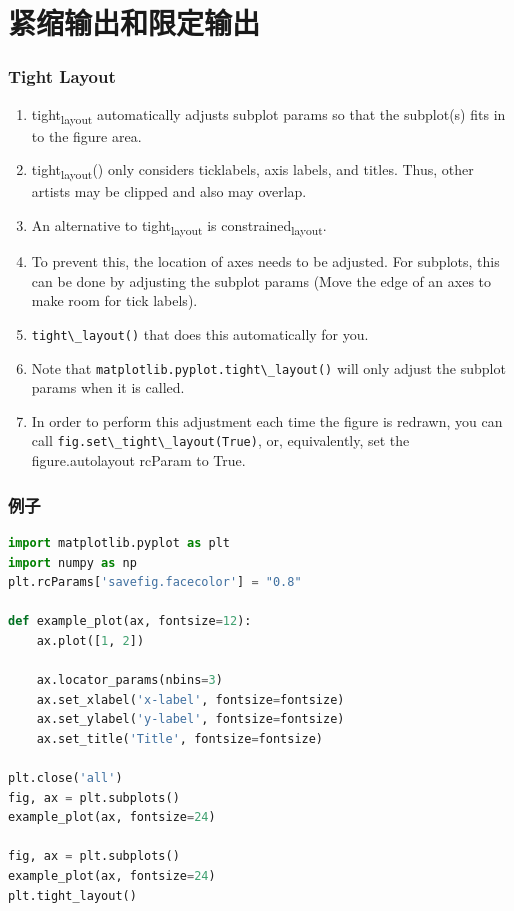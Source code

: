 \documentclass[UTF8,a4paper,12pt]{ctexart}  %
\providecommand{\tightlist}{\setlength{\itemsep}{0pt}\setlength{\parskip}{0pt}}
\newcommand{\passthrough}[1]{\lstset{mathescape=false}#1\lstset{mathescape=true}}
\begin{document}
\hypertarget{ux7d27ux7f29ux8f93ux51faux548cux9650ux5b9aux8f93ux51fa}{%
\section{紧缩输出和限定输出}\label{ux7d27ux7f29ux8f93ux51faux548cux9650ux5b9aux8f93ux51fa}}

\hypertarget{tight-layout}{%
\subsubsection{Tight Layout}\label{tight-layout}}

\begin{enumerate}
\def\labelenumi{\arabic{enumi}.}
\tightlist
\item
  tight\textsubscript{layout} automatically adjusts subplot params so that the
  subplot(s) fits in to the figure area.
\item
  tight\textsubscript{layout}() only considers ticklabels, axis labels, and titles.
  Thus, other artists may be clipped and also may overlap.
\item
  An alternative to tight\textsubscript{layout} is constrained\textsubscript{layout}.
\item
  To prevent this, the location of axes needs to be adjusted. For
  subplots, this can be done by adjusting the subplot params (Move the
  edge of an axes to make room for tick labels).
\item
  \passthrough{\lstinline!tight\_layout()!} that does this automatically for you.
\item
  Note that \passthrough{\lstinline!matplotlib.pyplot.tight\_layout()!} will only adjust the
  subplot params when it is called.
\item
  In order to perform this adjustment each time the figure is redrawn,
  you can call \passthrough{\lstinline!fig.set\_tight\_layout(True)!}, or, equivalently, set the
  figure.autolayout rcParam to True.
\end{enumerate}

\hypertarget{ux4f8bux5b50-9}{%
\subsubsection{例子}\label{ux4f8bux5b50-9}}

\begin{lstlisting}[language=Python]
import matplotlib.pyplot as plt
import numpy as np
plt.rcParams['savefig.facecolor'] = "0.8"

def example_plot(ax, fontsize=12):
    ax.plot([1, 2])

    ax.locator_params(nbins=3)
    ax.set_xlabel('x-label', fontsize=fontsize)
    ax.set_ylabel('y-label', fontsize=fontsize)
    ax.set_title('Title', fontsize=fontsize)

plt.close('all')
fig, ax = plt.subplots()
example_plot(ax, fontsize=24)

fig, ax = plt.subplots()
example_plot(ax, fontsize=24)
plt.tight_layout()
\end{lstlisting}
\end{document}
